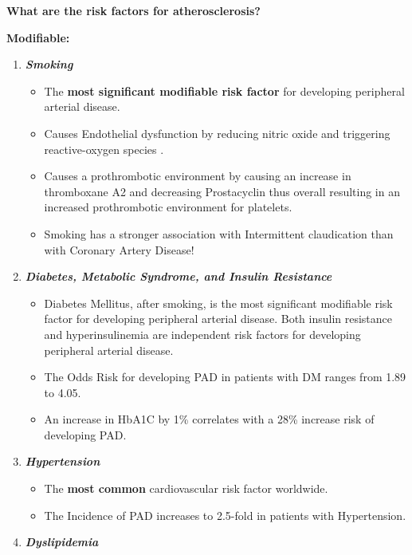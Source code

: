 \documentclass[
]{book}
\begin{document}
\textbf{What are the risk factors for atherosclerosis?}

\textbf{Modifiable:}

\begin{enumerate}
\def\labelenumi{\arabic{enumi}.}
\item
  \textbf{\emph{Smoking}}

  \begin{itemize}
  \item
    The \textbf{most significant modifiable risk factor} for developing
    peripheral arterial disease.
  \item
    Causes Endothelial dysfunction by reducing nitric oxide and
    triggering reactive-oxygen species
    \citep{unitedstatessurgeongeneralHealthConsequencesSmoking2014}.
  \item
    Causes a prothrombotic environment by causing an increase in
    thromboxane A2 and decreasing Prostacyclin thus overall
    resulting in an increased prothrombotic environment for
    platelets.
  \item
    Smoking has a stronger association with Intermittent
    claudication than with Coronary Artery Disease!
    \citep{gordonPredispositionAtherosclerosisHead1972}
  \end{itemize}
\item
  \textbf{\emph{Diabetes, Metabolic Syndrome, and Insulin Resistance}}

  \begin{itemize}
  \item
    Diabetes Mellitus, after smoking, is the most significant
    modifiable risk factor for developing peripheral arterial
    disease. Both insulin resistance and hyperinsulinemia are
    independent risk factors for developing peripheral arterial
    disease.
  \item
    The Odds Risk for developing PAD in patients with DM ranges from
    1.89 to 4.05.
  \item
    An increase in HbA1C by 1\% correlates with a 28\% increase risk
    of developing PAD. \citep{adlerUKPDS59Hyperglycemia2002}
  \end{itemize}
\item
  \textbf{\emph{Hypertension}}

  \begin{itemize}
  \item
    The \textbf{most common} cardiovascular risk factor worldwide.
  \item
    The Incidence of PAD increases to 2.5-fold in patients with
    Hypertension. \citep{kannelUpdateEpidemiologicFeatures1985}
  \end{itemize}
\item
  \textbf{\emph{Dyslipidemia}}


\end{enumerate}
\end{document}
